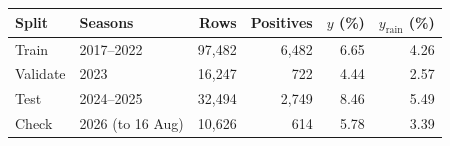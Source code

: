 \begin{tabular}{llrrrr}
\toprule
Split & Seasons & Rows & Positives & $y$ (\%) & $y_{\mathrm{rain}}$ (\%) \\
\midrule
Train & 2017--2022 & 97,482 & 6,482 & 6.65 & 4.26 \\
Validate & 2023 & 16,247 & 722 & 4.44 & 2.57 \\
Test & 2024--2025 & 32,494 & 2,749 & 8.46 & 5.49 \\
Check & 2026 (to 16 Aug) & 10,626 & 614 & 5.78 & 3.39 \\
\bottomrule
\end{tabular}
